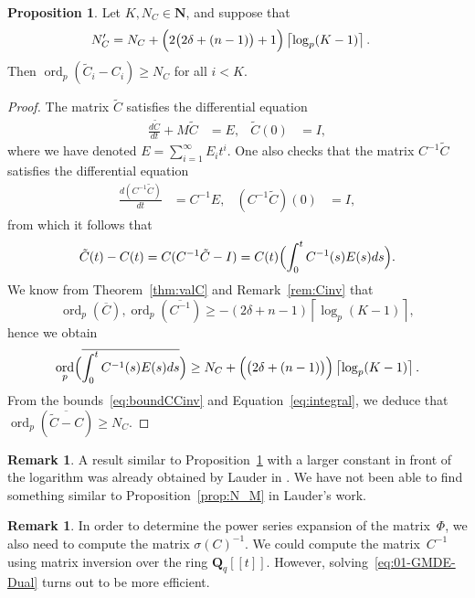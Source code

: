 \documentclass[a4paper,11pt]{article}
\numberwithin{equation}{section}
\providecommand{\ceil}[1]{\left\lceil#1\right\rceil}   %
\newcommand{\NN}{\mathbf{N}} %
\DeclareMathOperator{\ord}{ord}          %
\theoremstyle{definition}
\newtheorem{prop}[thm]{Proposition}
\newtheorem{rem}[thm]{Remark}
\begin{document}
\begin{prop} \label{thm:errorprop}
Let $K,N_{C} \in \NN$, and suppose that
\begin{align*}
N'_C          &= N_{C} + \Bigl(2 \bigl(2 \delta + (n-1)\bigr) + 1\Bigr) \ceil{\log_p(K-1)}.
\end{align*} 
Then $\ord_p(\tilde{C}_i-C_i) \geq N_{C}$ for all $i < K$.
\end{prop}

\begin{proof}
The matrix $\tilde{C}$ satisfies the differential equation
\begin{align*}
\frac{d\tilde{C}}{dt}+M \tilde{C}&=E, &\tilde{C}(0)&=I,
\end{align*}
where we have denoted $E=\sum_{i=1}^{\infty} E_i t^i$.
One also checks that the matrix $C^{-1}\tilde{C}$ satisfies 
the differential equation
\begin{align*}
\frac{d(C^{-1}\tilde{C})}{dt} &=C^{-1} E, &(C^{-1}\tilde{C})(0)&=I,
\end{align*}
from which it follows that
\begin{equation} \label{eq:integral}
\tilde{C}(t)-C(t) = C(C^{-1} \tilde{C}-I) = C(t) \Bigl(\int_{0}^t C^{-1}(s) E(s) ds \Bigr).
\end{equation}
We know from Theorem~\ref{thm:valC} and 
Remark~\ref{rem:Cinv} that
\begin{equation} \label{eq:boundCCinv}
\ord_p(\overline{C}),\ord_p(\overline{C^{-1}}) \geq 
-(2 \delta + n-1) \ceil{\log_p(K-1)},
\end{equation}
hence we obtain
\[
\ord_p \Bigl(\overline{\int_{0}^t C^{-1}(s) E(s) ds }\Bigr) \geq 
N_{C} + \Bigl( \bigl(2 \delta + (n-1)\bigr) \Bigr) \ceil{\log_p(K-1)}.
\]
From the bounds~\eqref{eq:boundCCinv} and Equation~\eqref{eq:integral}, 
we deduce that $\ord_p(\overline{\tilde{C}-C}) \geq N_C$.
\end{proof}

\begin{rem}
A result similar to Proposition~\ref{thm:errorprop} with a larger constant in front of 
the logarithm was already obtained by Lauder in \citep[Theorem 5.1]{Lauder2006}. We have
not been able to find something similar to Proposition~\ref{prop:N_M} in Lauder's work.
\end{rem}

\begin{rem} \label{rem:sigmatrick}
In order to determine the power series expansion of the matrix~$\Phi$, 
we also need to compute the matrix $\sigma(C)^{-1}$. We could compute 
the matrix~$C^{-1}$ using matrix inversion over the ring $\mathbf{Q}_q[[t]]$. 
However, solving~\eqref{eq:01-GMDE-Dual} turns
out to be more efficient. 
\end{rem}
\end{document}
